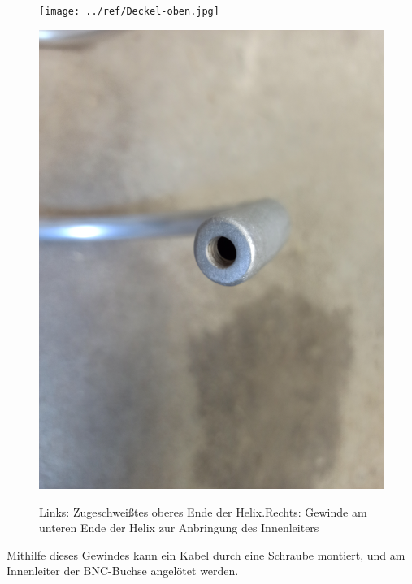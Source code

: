 \begin{figure}[h!]
	\begin{minipage}[b]{.4\linewidth} %
		\texttt{[image: ../ref/Deckel-oben.jpg]}
		\label{fig:Deckel-Helix-Oben}
	\end{minipage}
	\hspace{.1\linewidth}%
	\begin{minipage}[b]{.4\linewidth} %
		\includegraphics[width=\linewidth]{../ref/Anschluss-unten.jpg}
		\label{fig:Deckel-Helix-Unten}
	\end{minipage}
	\caption{Links: Zugeschweißtes oberes Ende der Helix.Rechts: Gewinde am unteren Ende der Helix zur Anbringung des Innenleiters}
\end{figure}

Mithilfe dieses Gewindes kann ein Kabel durch eine Schraube montiert, und am Innenleiter der BNC-Buchse angelötet werden.

